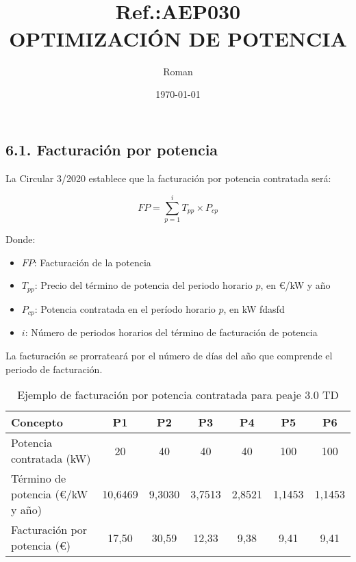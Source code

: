 \documentclass[a4paper,10pt,twocolumn]{article}
\title{{ \qrcode[height=1.3cm]{https://doctec.blog/} \\ \small Ref.:\uppercase{Aep030}}\\{\textbf{OPTIMIZACIÓN DE POTENCIA}}}
\author{
Roman
}
\date{\today}
\begin{document}
\begin{Form}
	\maketitle

	\tableofcontents  %
	\listoffigures    %
	\listoftables     %



    
\newpage






\section*{6.1. Facturación por potencia}

La Circular 3/2020 establece que la facturación por potencia contratada será:

\[ FP = \sum_{p=1}^{i} T_{pp} \times P_{cp} \]

Donde:
\begin{itemize}
    \item $FP$: Facturación de la potencia
    \item $T_{pp}$: Precio del término de potencia del periodo horario $p$, en €/kW y año
    \item $P_{cp}$: Potencia contratada en el período horario $p$, en kW \cite{precios}{fdasfd}
    \item $i$: Número de periodos horarios del término de facturación de potencia
\end{itemize}

La facturación se prorrateará por el número de días del año que comprende el periodo de facturación.


\begin{table}[h]
\centering
\caption{Ejemplo de facturación por potencia contratada para peaje 3.0 TD}
\begin{tabular}{lcccccc}
\toprule
Concepto & P1 & P2 & P3 & P4 & P5 & P6 \\
\midrule
Potencia contratada (kW) & 20 & 40 & 40 & 40 & 100 & 100 \\
Término de potencia (€/kW y año) & 10,6469 & 9,3030 & 3,7513 & 2,8521 & 1,1453 & 1,1453 \\
Facturación por potencia (€) & 17,50 & 30,59 & 12,33 & 9,38 & 9,41 & 9,41 \\
\bottomrule
\end{tabular}
\end{table}





\end{Form}
\end{document}
